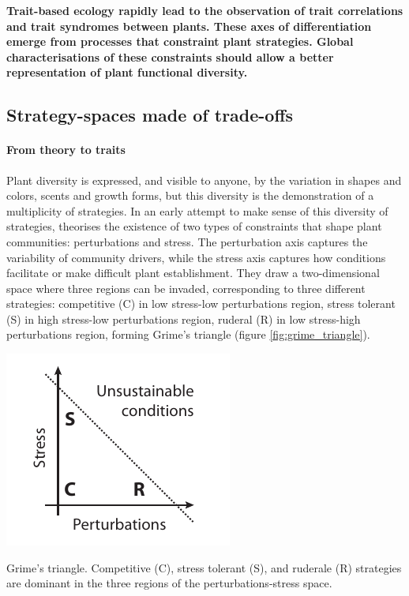 
\textbf{Trait-based ecology rapidly lead to the observation of trait correlations and trait syndromes between plants. These axes of differentiation emerge from processes that constraint plant strategies. Global characterisations of these constraints should allow a better representation of plant functional diversity.}

\subsection{Strategy-spaces made of trade-offs}

\paragraph{From theory to traits}

Plant diversity is expressed, and visible to anyone, by the variation in shapes and colors, scents and growth forms, but this diversity is the demonstration of a multiplicity of strategies. In an early attempt to make sense of this diversity of strategies, \citet{grime_evidence_1977} theorises the existence of two types of constraints that shape plant communities: perturbations and stress. The perturbation axis captures the variability of community drivers, while the stress axis captures how conditions facilitate or make difficult plant establishment. They draw a two-dimensional space where three regions can be invaded, corresponding to three different strategies: competitive (C) in low stress-low perturbations region, stress tolerant (S) in high stress-low perturbations region, ruderal (R) in low stress-high perturbations region, forming Grime's triangle (\see figure \ref{fig:grime_triangle}).

\begin{marginfigure}
    \includegraphics{./Figures/Grime_triangle.pdf}
  \caption[Diversity insurance effect]{Grime's triangle. Competitive (C), stress tolerant (S), and ruderale (R) strategies are dominant in the three regions of the perturbations-stress space.}
  \label{fig:grime_triangle}
\end{marginfigure}

